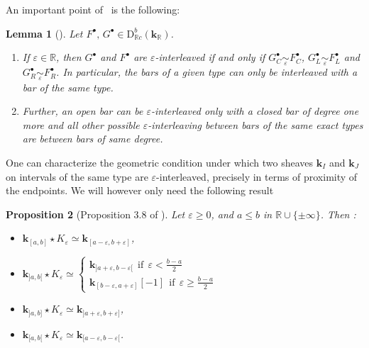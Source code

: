 \documentclass[a4paper, english, 11pt]{article}
\newcommand{\kk}[0]{\textbf{k}}
\newcommand{\0}{\vec{0}}
\newcommand{\R}[0]{\mathbb{R}}
\newcommand{\D}[0]{\text{D}}
\newtheorem{prop}{Proposition}[section]
\newtheorem{lem}[prop]{Lemma}
\begin{document}
An important point of~\cite{Berk18} is the following:
\begin{lem}[\cite{Berk18}]\label{L:Caracinterleaving} Let $F^\bullet, \, G^\bullet \in \D^b_{\R c}(\kk_\R)$.
\begin{enumerate}
\item If $\varepsilon \in \R$, then $G^\bullet$ and $F^\bullet$ are $\varepsilon$-interleaved if and only if 
 $G_C^\bullet \mathop{\sim}\limits_{\varepsilon} F_C^\bullet$, $G_L^\bullet \mathop{\sim}\limits_{\varepsilon} F_L^\bullet$ and $G_R^\bullet \mathop{\sim}\limits_{\varepsilon} F_R^\bullet$. In particular, 
 the bars of a given type can only be interleaved with a bar of the same type.
 \item Further, an open bar can be $\varepsilon$-interleaved only with a closed bar of degree one more and all other possible $\varepsilon$-interleaving between bars of the same exact types are between bars of same degree. \end{enumerate}
\end{lem}
One can characterize the geometric  condition under which two sheaves $\kk_I$ and $\kk_J$ on intervals of the same type are $\varepsilon$-interleaved, precisely in terms of proximity of the endpoints. We will however only need the following result

\begin{prop}[Proposition 3.8 of \cite{Berk18}]\label{P:P38Berk18}
Let $\varepsilon \geq 0$, and $a\leq b$ in $\R \cup \{\pm \infty\}$. Then : 
\begin{itemize}
\item[$\bullet$] $\kk_{[a,b]}\star K_\varepsilon \simeq \kk_{[a-\varepsilon, b + \varepsilon]} $,
\item[$\bullet$] $\kk_{]a,b[}\star K_\varepsilon \simeq 
\begin{cases}
\kk_{]a+\varepsilon,b-\varepsilon[} ~~\text{if} ~~\varepsilon < \frac{b-a }{2} \\
\kk_{[b- \varepsilon , a+ \varepsilon]}[-1] ~~\text{if} ~~\varepsilon \geq \frac{b-a }{2}
\end{cases}$

\item[$\bullet$] $\kk_{]a,b]}\star K_\varepsilon \simeq \kk_{]a+\varepsilon, b + \varepsilon]} $,
\item[$\bullet$] $\kk_{[a,b[}\star K_\varepsilon \simeq \kk_{[a-\varepsilon, b - \varepsilon[} $.
\end{itemize}
\end{prop}
\end{document}
